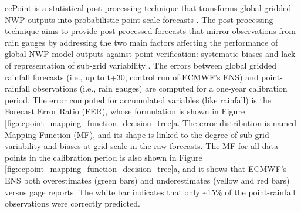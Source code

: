 ecPoint  is a statistical post-processing technique that transforms global gridded NWP outputs into probabilistic point-scale forecasts \citep{Hewson_2021}. The post-processing technique aims to provide post-processed forecasts that mirror observations from rain gauges by addressing the two main factors affecting the performance of global NWP model outputs against point verification: systematic biases \citep{Lavers_2021} and lack of representation of sub-grid variability \citep{Gober_2008}. The errors between global gridded rainfall forecasts (i.e., up to t+30, control run of ECMWF's ENS) and point-rainfall observations (i.e., rain gauges) are computed for a one-year calibration period. The error computed for accumulated variables (like rainfall) is the Forecast Error Ratio (FER), whose formulation is shown in Figure \ref{fig:ecpoint_mapping_function_decision_tree}a. The error distribution is named Mapping Function (MF), and its shape is linked to the degree of sub-grid variability and biases at grid scale in the raw forecasts. The MF for all data points in the calibration period is also shown in Figure \ref{fig:ecpoint_mapping_function_decision_tree}a, and it shows that ECMWF's ENS both overestimates (green bars) and underestimates (yellow and red bars) versus gage reports. The white bar indicates that only \textasciitilde15\% of the point-rainfall observations were correctly predicted.

